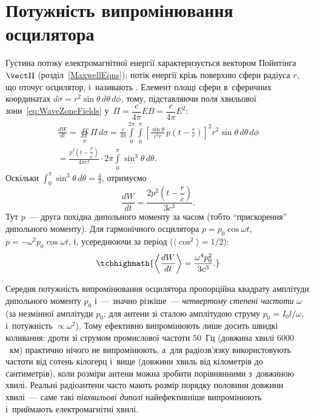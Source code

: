 \section{Потужність випромінювання осцилятора}\hypertarget{oscillator-radiated-power}{}

Густина потоку електромагнітної енергії характеризується вектором Пойнтінга $\vect\Pi$
(розділ~\ref{MaxwellEqns}); потік енергії крізь поверхню сфери радіуса $r$, що оточує
осцилятор, і~називають . Елемент площі сфери в~сферичних
координатах $d\sigma = r^2\sin\theta\, d\theta\, d\phi$, тому, підставляючи поля
хвильової зони~\eqref{eq:WaveZoneFields} у~$\Pi = \dfrac{c}{4\pi}EB = \dfrac{c}{4\pi}E^2$:
\begin{multline}\label{eq:PowerInstant}
	\frac{dW}{dt} = \oiint\limits_\sigma \Pi\, d\sigma =
	\frac{c}{4\pi}\int\limits_0^{2\pi}\!\!\int\limits_0^\pi
	\left[\frac{\sin\theta}{c^2r}\, \ddot{p}\!\left(t-\frac{r}{c}\right)\right]^2
	r^2\sin\theta\, d\theta\, d\phi \\ {}= \frac{\ddot{p}^2\!\left(t-\dfrac{r}{c}\right)}{4\pi c^3}\cdot2\pi\int\limits_0^\pi\sin^3\theta\,
	d\theta.
\end{multline}
Оскільки $\displaystyle\int_0^\pi\sin^3\theta\,d\theta = \frac43$, отримуємо
\begin{equation}\label{eq:PowerInstantResult}
	\frac{dW}{dt} = \frac{2\ddot{p}^2\!\left(t-\dfrac{r}{c}\right)}{3c^3}.
\end{equation}
Тут $\ddot{p}$~--- друга похідна дипольного моменту за часом (тобто \enquote{прискорення}
дипольного моменту). Для гармонічного осцилятора $p=p_0\cos\omega t$, $\ddot{p} =
-\omega^2p_0\cos\omega t$, і, усереднюючи за період ($\langle\cos^2\rangle=1/2$):
\begin{equation}\label{eq:PowerAveraged}
	\tcbhighmath{ \left\langle\frac{dW}{dt}\right\rangle = \frac{\omega^4p_0^2}{3c^3}. }
\end{equation}

Середня потужність випромінювання осцилятора пропорційна квадрату амплітуди дипольного
моменту $p_0$ і~--- значно різкіше~--- \emph{четвертому степені частоти} $\omega$ (за незмінної амплітуди $p_0$; для антени зі сталою
амплітудою струму $p_0=I_0l/\omega$, і~потужність $\propto\omega^2$). Тому
ефективно випромінюють лише досить швидкі коливання: дроти зі струмом промислової частоти $50$~Гц (довжина хвилі
$6000$~км) практично нічого не випромінюють, а~для радіозв'язку використовують частоти від сотень кілогерц і~вище (довжини
хвиль від кілометрів до сантиметрів), коли розміри антени можна зробити порівнянними з~довжиною хвилі. Реальні
радіоантени часто мають розмір порядку половини довжини хвилі~--- саме такі
\emph{півхвильові диполі} найефективніше випромінюють
і~приймають електромагнітні хвилі.



